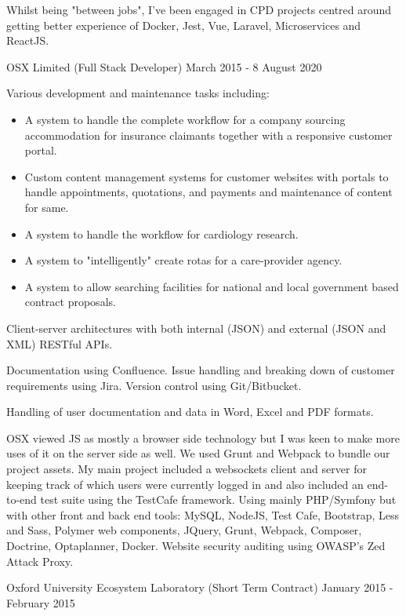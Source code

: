 Whilst being "between jobs", I've been engaged in CPD projects centred around
getting better experience of Docker, Jest, Vue, Laravel, Microservices and
ReactJS.

\jobHeading
    {OSX Limited (Full Stack Developer)}
    {March 2015 - 8 August 2020}

Various development and maintenance tasks including:
\begin{itemize}
    \item A system to handle the complete workflow for a company sourcing accommodation for insurance claimants together with a responsive customer portal.
    \item Custom content management systems for customer websites with portals to handle appointments, quotations, and payments and maintenance of content for same.
    \item A system to handle the workflow for cardiology research.
    \item A system to "intelligently" create rotas for a care-provider agency.
    \item A system to allow searching facilities for national and local government based contract proposals.
\end{itemize}

Client-server architectures with both
internal (JSON) and external (JSON and XML) RESTful APIs.

Documentation using Confluence. Issue handling and breaking down
of customer requirements using Jira. Version control using Git/Bitbucket.

Handling of user documentation and data in Word, Excel and PDF formats.


\ifnum{}
    OSX viewed JS as mostly a browser side technology
    but I was keen to make more uses of it on the server side as well.
    We used Grunt and Webpack to bundle our project assets.
    My main project included a websockets client and server
    for keeping track of which users were currently logged in
    and also included an end-to-end test suite
    using the TestCafe framework.
\else
    Using mainly PHP/Symfony but with other front and back end tools:
    MySQL, NodeJS, Test Cafe, Bootstrap, Less and Sass,
    Polymer web components, JQuery, Grunt, Webpack, Composer,
    Doctrine, Optaplanner, Docker.
    Website security auditing using OWASP's Zed Attack Proxy.
\fi

\jobHeading
    {Oxford University Ecosystem Laboratory (Short Term Contract)}
    {January 2015 - February 2015}

